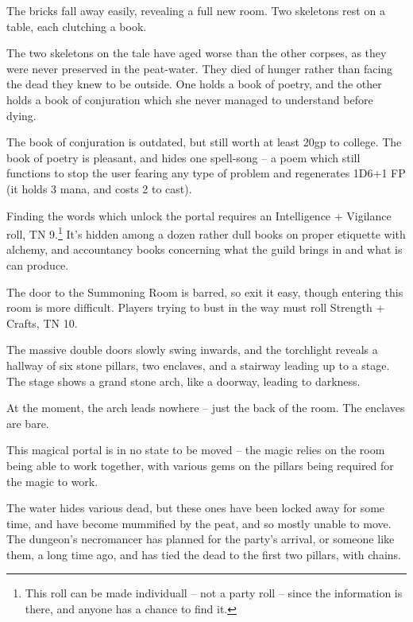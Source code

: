 \begin{multicols}{2}
\begin{boxtext}
	The bricks fall away easily, revealing a full new room.  Two skeletons rest on a table, each clutching a book.

\end{boxtext}

The two skeletons on the tale have aged worse than the other corpses, as they were never preserved in the peat-water.  They died of hunger rather than facing the dead they knew to be outside.  One holds a book of poetry, and the other holds a book of conjuration which she never managed to understand before dying.

The book of conjuration is outdated, but still worth at least 20gp to \gls{college}.  The book of poetry is pleasant, and hides one spell-song -- a poem which still functions to stop the user fearing any type of problem and regenerates 1D6+1 FP (it holds 3 mana, and costs 2 to cast).

Finding the words which unlock the portal requires an Intelligence + Vigilance roll, TN 9.\footnote{This roll can be made individuall -- not a party roll -- since the information is there, and anyone has a chance to find it.}  It's hidden among a dozen rather dull books on proper etiquette with alchemy, and accountancy books concerning what the guild brings in and what is can produce.

The door to the Summoning Room is barred, so exit it easy, though entering this room is more difficult.  Players trying to bust in the way must roll Strength + Crafts, TN 10.


\begin{boxtext}
	The massive double doors slowly swing inwards, and the torchlight reveals a hallway of six stone pillars, two enclaves, and a stairway leading up to a stage.  The stage shows a grand stone arch, like a doorway, leading to darkness.
\end{boxtext}

At the moment, the arch leads nowhere  -- just the back of the room.  The enclaves are bare.

This magical portal is in no state to be moved -- the magic relies on the room being able to work together, with various gems on the pillars being required for the magic to work.

The water hides various dead, but these ones have been locked away for some time, and have become mummified by the peat, and so mostly unable to move.  The dungeon's necromancer has planned for the party's arrival, or someone like them, a long time ago, and has tied the dead to the first two pillars, with chains.


\end{multicols}
